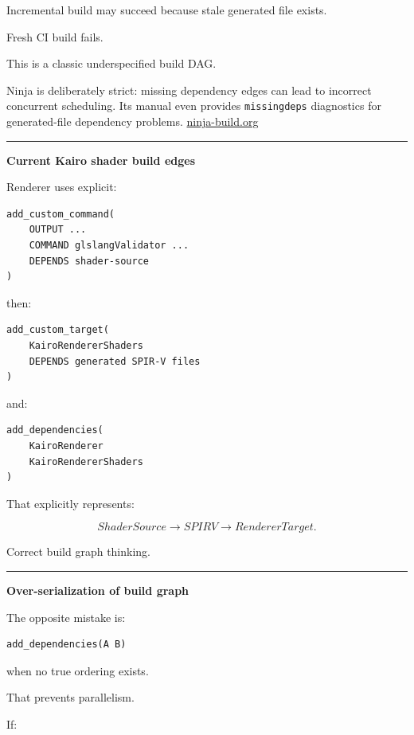 Incremental build may succeed because stale generated file exists.

Fresh CI build fails.

This is a classic underspecified build DAG.

Ninja is deliberately strict: missing dependency edges can lead to incorrect concurrent scheduling. Its manual even provides \texttt{missingdeps} diagnostics for generated-file dependency problems. \href{https://ninja-build.org/manual.html?utm_source=chatgpt.com}{ninja-build.org}

\begin{center}\rule{0.5\linewidth}{0.5pt}\end{center}

\textbf{Current Kairo shader build edges}

Renderer uses explicit:

\begin{verbatim}
add_custom_command(
    OUTPUT ...
    COMMAND glslangValidator ...
    DEPENDS shader-source
)
\end{verbatim}

then:

\begin{verbatim}
add_custom_target(
    KairoRendererShaders
    DEPENDS generated SPIR-V files
)
\end{verbatim}

and:

\begin{verbatim}
add_dependencies(
    KairoRenderer
    KairoRendererShaders
)
\end{verbatim}

That explicitly represents:

\[
ShaderSource
\rightarrow
SPIRV
\rightarrow
RendererTarget.
\]

Correct build graph thinking.

\begin{center}\rule{0.5\linewidth}{0.5pt}\end{center}

\textbf{Over-serialization of build graph}

The opposite mistake is:

\begin{verbatim}
add_dependencies(A B)
\end{verbatim}

when no true ordering exists.

That prevents parallelism.

If:

